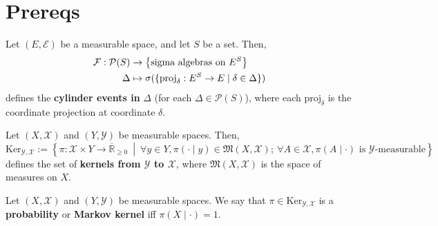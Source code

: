 
\chapter{Prereqs}

\begin{definition}
    \label{def:cylinder-event}
    \leanok

    Let $(E,\mathcal{E})$ be a measurable space, and let $S$ be a set. Then,
    \begin{align}
        \mathcal{F}:\mathcal{P}(S)&\to \left\{ \text{sigma algebras on } E^S \right\}\\
        \Delta&\mapsto \sigma(\{\text{proj}_\delta:E^S\to E\mid \delta\in \Delta\})
    \end{align}
    defines the \textbf{cylinder events in }$\Delta$ (for each $\Delta\in\mathcal{P}(S)$),
    where each $\text{proj}_\delta$ is the coordinate projection at coordinate $\delta$.
\end{definition}

\begin{definition}[Kernel]
    \label{def:kernel}
    \leanok

    Let $(X,\mathcal{X})$ and $(Y,\mathcal{Y})$ be measurable spaces. Then,
    \begin{equation*}
        \text{Ker}_{\mathcal{Y},\mathcal{X}}:=\left\{\pi:\mathcal{X}\times Y\to\overline{\mathbb{R}}_{\geq0}~\middle\vert~ \forall y\in Y,\pi(\cdot\mid y)\in\mathfrak{M}(X,\mathcal{X});~\forall A\in\mathcal{X},\pi(A\mid\cdot)\text{ is }\mathcal{Y}\text{-measurable}\right\}
    \end{equation*}
    defines the set of \textbf{kernels from $\mathcal{Y}$ to $\mathcal{X}$}, where $\mathfrak{M}(X,\mathcal{X})$ is the space of measures on $X$.

\end{definition}

\begin{definition}
    \label{def:markov-ker}
    \leanok

    Let $(X,\mathcal{X})$ and $(Y,\mathcal{Y})$ be measurable spaces. We say that $\pi\in\text{Ker}_{\mathcal{Y},\mathcal{X}}$ is a \textbf{probability} or \textbf{Markov kernel} iff $\pi(X\mid \cdot)=1$.
\end{definition}

